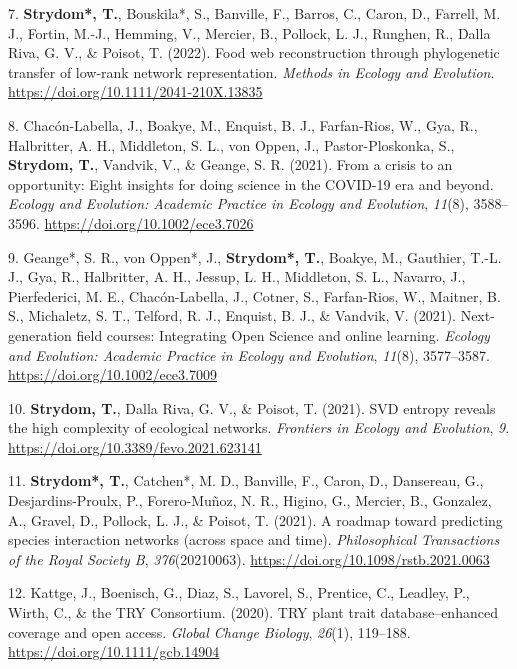 \documentclass[11pt,a4paper,]{awesome-cv}
\newlength{\cslhangindent}
\newenvironment{CSLReferences}[2] %
 {\begin{list}{}{%
  \setlength{\itemindent}{0pt}
  \setlength{\leftmargin}{0pt}
  \setlength{\parsep}{0pt}
  \ifodd #1
   \setlength{\leftmargin}{\cslhangindent}
   \setlength{\itemindent}{-1\cslhangindent}
  \fi
  \setlength{\itemsep}{#2\baselineskip}}}
 {\end{list}}
\begin{document}
\begin{CSLReferences}{1}{0}
7. \textbf{Strydom*, T.}, Bouskila*, S., Banville, F., Barros, C.,
Caron, D., Farrell, M. J., Fortin, M.-J., Hemming, V., Mercier, B.,
Pollock, L. J., Runghen, R., Dalla Riva, G. V., \& Poisot, T. (2022).
Food web reconstruction through phylogenetic transfer of low-rank
network representation. \emph{Methods in Ecology and Evolution}.
\url{https://doi.org/10.1111/2041-210X.13835}

8. Chacón-Labella, J., Boakye, M., Enquist, B. J., Farfan-Rios, W., Gya,
R., Halbritter, A. H., Middleton, S. L., von Oppen, J.,
Pastor-Ploskonka, S., \textbf{Strydom, T.}, Vandvik, V., \& Geange, S.
R. (2021). From a crisis to an opportunity: Eight insights for doing
science in the COVID-19 era and beyond. \emph{Ecology and Evolution:
Academic Practice in Ecology and Evolution}, \emph{11}(8), 3588--3596.
\url{https://doi.org/10.1002/ece3.7026}

9. Geange*, S. R., von Oppen*, J., \textbf{Strydom*, T.}, Boakye, M.,
Gauthier, T.-L. J., Gya, R., Halbritter, A. H., Jessup, L. H.,
Middleton, S. L., Navarro, J., Pierfederici, M. E., Chacón-Labella, J.,
Cotner, S., Farfan-Rios, W., Maitner, B. S., Michaletz, S. T., Telford,
R. J., Enquist, B. J., \& Vandvik, V. (2021). Next-generation field
courses: Integrating Open Science and online learning. \emph{Ecology and
Evolution: Academic Practice in Ecology and Evolution}, \emph{11}(8),
3577--3587. \url{https://doi.org/10.1002/ece3.7009}

10. \textbf{Strydom, T.}, Dalla Riva, G. V., \& Poisot, T. (2021). SVD
entropy reveals the high complexity of ecological networks.
\emph{Frontiers in Ecology and Evolution}, \emph{9}.
\url{https://doi.org/10.3389/fevo.2021.623141}

11. \textbf{Strydom*, T.}, Catchen*, M. D., Banville, F., Caron, D.,
Dansereau, G., Desjardins-Proulx, P., Forero-Muñoz, N. R., Higino, G.,
Mercier, B., Gonzalez, A., Gravel, D., Pollock, L. J., \& Poisot, T.
(2021). A roadmap toward predicting species interaction networks (across
space and time). \emph{Philosophical Transactions of the Royal Society
B}, \emph{376}(20210063). \url{https://doi.org/10.1098/rstb.2021.0063}

12. Kattge, J., Boenisch, G., Diaz, S., Lavorel, S., Prentice, C.,
Leadley, P., Wirth, C., \& the TRY Consortium. (2020). TRY plant trait
database--enhanced coverage and open access. \emph{Global Change
Biology}, \emph{26}(1), 119--188.
\url{https://doi.org/10.1111/gcb.14904}

\end{CSLReferences}
\end{document}

